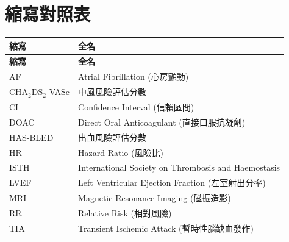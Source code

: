 \documentclass[12pt,a4paper]{article}
\begin{document}
\section{縮寫對照表}

\begin{longtable}{p{4cm}p{10cm}}
\toprule
\textbf{縮寫} & \textbf{全名} \\
\midrule
\endfirsthead
\toprule
\textbf{縮寫} & \textbf{全名} \\
\midrule
\endhead
\bottomrule
\endfoot

AF & Atrial Fibrillation (心房顫動) \\
CHA$_2$DS$_2$-VASc & 中風風險評估分數 \\
CI & Confidence Interval (信賴區間) \\
DOAC & Direct Oral Anticoagulant (直接口服抗凝劑) \\
HAS-BLED & 出血風險評估分數 \\
HR & Hazard Ratio (風險比) \\
ISTH & International Society on Thrombosis and Haemostasis \\
LVEF & Left Ventricular Ejection Fraction (左室射出分率) \\
MRI & Magnetic Resonance Imaging (磁振造影) \\
RR & Relative Risk (相對風險) \\
TIA & Transient Ischemic Attack (暫時性腦缺血發作) \\
\bottomrule
\end{longtable}
\end{document}
